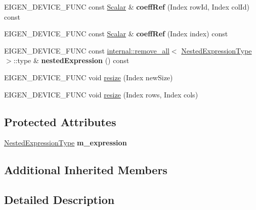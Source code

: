 \begin{DoxyCompactItemize}
E\+I\+G\+E\+N\+\_\+\+D\+E\+V\+I\+C\+E\+\_\+\+F\+U\+NC const \mbox{\hyperlink{class_eigen_1_1_dense_base_a5feed465b3a8e60c47e73ecce83e39a2}{Scalar}} \& {\bfseries coeff\+Ref} (Index row\+Id, Index col\+Id) const
\item 
\mbox{\label{class_eigen_1_1_matrix_wrapper_ab1ca2a4f4f6dc9561bd07ee36165b5cd}} 
E\+I\+G\+E\+N\+\_\+\+D\+E\+V\+I\+C\+E\+\_\+\+F\+U\+NC const \mbox{\hyperlink{class_eigen_1_1_dense_base_a5feed465b3a8e60c47e73ecce83e39a2}{Scalar}} \& {\bfseries coeff\+Ref} (Index index) const
\item 
\mbox{\label{class_eigen_1_1_matrix_wrapper_a53bb7f6775efcbe290550ea3111a182f}} 
E\+I\+G\+E\+N\+\_\+\+D\+E\+V\+I\+C\+E\+\_\+\+F\+U\+NC const \mbox{\hyperlink{struct_eigen_1_1internal_1_1remove__all}{internal\+::remove\+\_\+all}}$<$ \mbox{\hyperlink{struct_eigen_1_1internal_1_1true__type}{Nested\+Expression\+Type}} $>$\+::type \& {\bfseries nested\+Expression} () const
\item 
E\+I\+G\+E\+N\+\_\+\+D\+E\+V\+I\+C\+E\+\_\+\+F\+U\+NC void \mbox{\hyperlink{class_eigen_1_1_matrix_wrapper_a0244fd1071715e2b0cd60e39c1e6e56a}{resize}} (Index new\+Size)
\item 
E\+I\+G\+E\+N\+\_\+\+D\+E\+V\+I\+C\+E\+\_\+\+F\+U\+NC void \mbox{\hyperlink{class_eigen_1_1_matrix_wrapper_a6b0c3c352ad14c57294b022237b7489f}{resize}} (Index rows, Index cols)
\end{DoxyCompactItemize}
\subsection*{Protected Attributes}
\begin{DoxyCompactItemize}
\item 
\mbox{\label{class_eigen_1_1_matrix_wrapper_acaedfe1135c26554407fee7b656b7482}} 
\mbox{\hyperlink{struct_eigen_1_1internal_1_1true__type}{Nested\+Expression\+Type}} {\bfseries m\+\_\+expression}
\end{DoxyCompactItemize}
\subsection*{Additional Inherited Members}


\subsection{Detailed Description}

